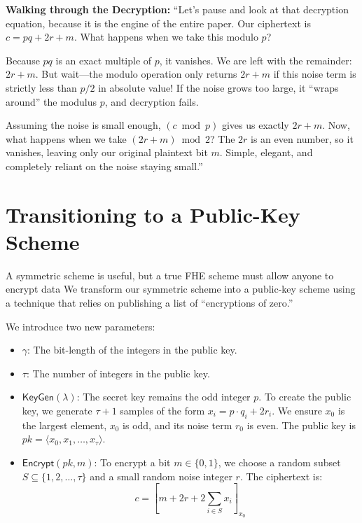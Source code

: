 \documentclass[11pt]{article}
\begin{document}
\begin{speakernote}
\textbf{Walking through the Decryption:}
``Let's pause and look at that decryption equation, because it is the engine of the entire paper. Our ciphertext is $c = pq + 2r + m$. What happens when we take this modulo $p$? 

Because $pq$ is an exact multiple of $p$, it vanishes. We are left with the remainder: $2r + m$. But wait—the modulo operation only returns $2r + m$ if this noise term is strictly less than $p/2$ in absolute value! If the noise grows too large, it ``wraps around'' the modulus $p$, and decryption fails. 

Assuming the noise is small enough, $(c \bmod p)$ gives us exactly $2r + m$. Now, what happens when we take $(2r + m) \bmod 2$? The $2r$ is an even number, so it vanishes, leaving only our original plaintext bit $m$. Simple, elegant, and completely reliant on the noise staying small.''
\end{speakernote}

\section{Transitioning to a Public-Key Scheme}

A symmetric scheme is useful, but a true FHE scheme must allow anyone to encrypt data We transform our symmetric scheme into a public-key scheme using a technique that relies on publishing a list of ``encryptions of zero.''

We introduce two new parameters:
\begin{itemize}
    \item $\gamma$: The bit-length of the integers in the public key.
    \item $\tau$: The number of integers in the public key.
\end{itemize}

\begin{itemize}
    \item $\mathsf{KeyGen}(\lambda)$: The secret key remains the odd integer $p$. To create the public key, we generate $\tau + 1$ samples of the form $x_i = p \cdot q_i + 2r_i$. We ensure $x_0$ is the largest element, $x_0$ is odd, and its noise term $r_0$ is even. The public key is $pk = \langle x_0, x_1, \dots, x_\tau \rangle$.
    
    \item $\mathsf{Encrypt}(pk, m)$: To encrypt a bit $m \in \{0, 1\}$, we choose a random subset $S \subseteq \{1, 2, \dots, \tau\}$ and a small random noise integer $r$. The ciphertext is:
    \begin{equation}
        c = \left[ m + 2r + 2\sum_{i \in S} x_i \right]_{x_0}
    \end{equation}
\end{itemize}
\end{document}
